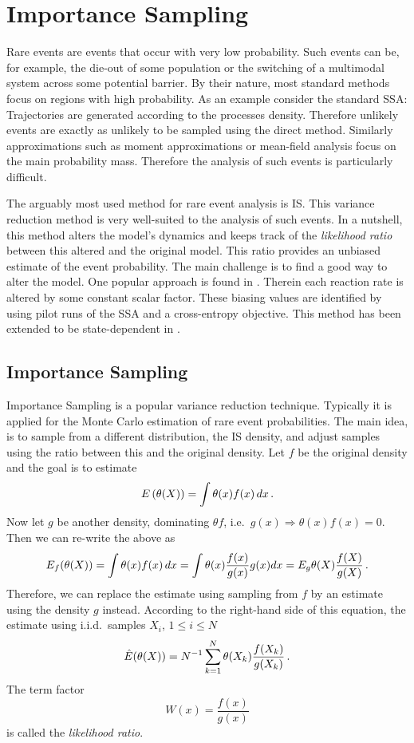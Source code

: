 \chapter{Importance Sampling}\label{ch:is}
Rare events are events that occur with very low probability.
Such events can be, for example, the die-out of some population or the switching of a multimodal system across some potential barrier.
By their nature, most standard methods focus on regions with high probability.
As an example consider the standard \ac{SSA}:
Trajectories are generated according to the processes density.
Therefore unlikely events are exactly as unlikely to be sampled using the direct method.
Similarly approximations such as moment approximations or mean-field analysis focus on the main probability mass.
Therefore the analysis of such events is particularly difficult.

The arguably most used method for rare event analysis is \acf{IS}.
This variance reduction method is very well-suited to the analysis of such events.
In a nutshell, this method alters the model's dynamics and keeps track of the \emph{likelihood ratio} between this altered and the original model.
This ratio provides an unbiased estimate of the event probability.
The main challenge is to find a good way to alter the model.
One popular approach is found in  \parencite{kuwahara2008efficient,daigle2011automated}.
Therein each reaction rate is altered by some constant scalar factor.
These biasing values are identified by using pilot runs of the \ac{SSA} and a cross-entropy objective.
This method has been extended to be state-dependent in \citet{roh2011state}.

\section{Importance Sampling}
Importance Sampling is  a popular variance reduction technique.
Typically it is applied for the Monte Carlo estimation of rare event probabilities.
The main idea, is to sample from a different distribution, the \ac{IS} density, and adjust samples using the ratio between this and the original density.
Let $f$ be the original density and the goal is to estimate
\[
    {E}\left(\theta(X)\right) = \int \theta(x)f(x)\,dx\,.
\]
Now let $g$ be another density, dominating $\theta f$, i.e.\ $g(x)\Rightarrow \theta(x)f(x) = 0$. Then we can re-write the above as
\[
    {E}_f({\theta(X)}) = \int \theta(x)f(x)\,dx = \int \theta(x) \frac{f(x)}{g(x)} g(x) dx = {E}_g \theta(X) \frac{f(X)}{g(X)}\,.
\]
Therefore, we can replace the estimate using sampling from $f$ by an estimate using the density $g$ instead.
According to the right-hand side of this equation, the estimate using i.i.d.\ samples $X_i$, $1\leq i \leq N$
\begin{equation}\label{eq:imp_sampl}
    \hat{{E}}(\theta(X)) = N^{-1} \sum_{k=1}^N \theta(X_k) \frac{f(X_k)}{g(X_k)}\,.
\end{equation}
The term factor
\[
    W(x) = \frac{f(x)}{g(x)}
\]
is called the \emph{likelihood ratio}.


